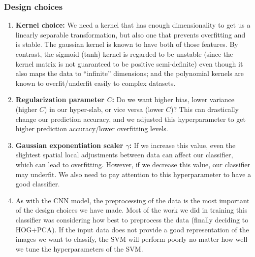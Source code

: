 \documentclass[10pt]{article} %
\begin{document}
\subsubsection{Design choices}
\begin{enumerate}
  \item \textbf{Kernel choice:} We need a kernel that has enough dimensionality to get us a linearly separable transformation, but also one that prevents overfitting and is stable. The gaussian kernel is known to have both of those features. By contrast, the sigmoid (tanh) kernel is regarded to be unstable (since the kernel matrix is not guaranteed to be positive semi-definite) even though it also maps the data to ``infinite'' dimensions; and the polynomial kernels are known to overfit/underfit easily to complex datasets.
  \item \textbf{Regularization parameter $C$:} Do we want higher bias, lower variance (higher $C$) in our hyper-slab, or vice versa (lower $C$)? This can drastically change our prediction accuracy, and we adjusted this hyperparameter to get higher prediction accuracy/lower overfitting levels.
  \item \textbf{Gaussian exponentiation scaler $\gamma$:} If we increase this value, even the slightest spatial local adjustments between data can affect our classifier, which can lead to overfitting. However, if we decrease this value, our classifier may underfit. We also need to pay attention to this hyperparameter to have a good classifier.
  \item As with the CNN model, the preprocessing of the data is the most important of the design choices we have made. Most of the work we did in training this classifier was considering how best to preprocess the data (finally deciding to HOG+PCA). If the input data does not provide a good representation of the images we want to classify, the SVM will perform poorly no matter how well we tune the hyperparameters of the SVM.
\end{enumerate}
\end{document}
